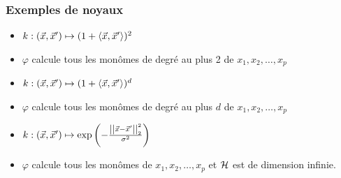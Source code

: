 \begin{frame}
  \frametitle{Exemples de noyaux}
  \begin{itemize}
  \item {} $k: (\vec{x}, \vec{x}^\prime) \mapsto (1 + \langle \vec{x}, \vec{x}^\prime \rangle)^2$
  \item[] $\varphi$ calcule tous les monômes de degré au plus 2 de $x_1, x_2, \dots, x_p$ 
    \pause
  \item {} $k: (\vec{x}, \vec{x}^\prime) \mapsto (1 + \langle \vec{x}, \vec{x}^\prime \rangle)^d$
  \item[] $\varphi$ calcule tous les monômes de degré au plus $d$ de $x_1, x_2, \dots, x_p$ 
    \pause 
  \item {} $k: (\vec{x}, \vec{x}^\prime) \mapsto
    \exp\left( - \frac{\left|\left|\vec{x} - \vec{x}^\prime\right|\right|_2^2}{\sigma^2} \right)$
  \item[] $\varphi$ calcule tous les monômes de $x_1, x_2, \dots, x_p$ 
  et $\mathcal{H}$ est de dimension infinie. 
  \end{itemize}
\end{frame}




